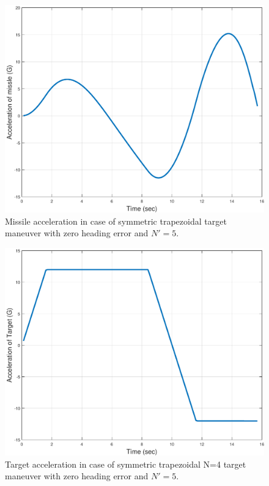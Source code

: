 \begin{figure}[htb]
	\centering
	\includegraphics[scale = 0.35]{fig/MissileAccelerationTrapSymm.pdf}
	\caption{Missile acceleration in case of symmetric trapezoidal target maneuver with zero heading error and $N'=5$.}
	\label{missile acceleration trapSymm}
\end{figure}

\begin{figure}[H]
	\centering
	\includegraphics[scale = 0.35]{fig/TargetAccelerationTrapSym.pdf}
	\caption{Target acceleration in case of symmetric trapezoidal N=4 target maneuver with zero heading error and $N'=5$.}
	\label{Target acceleration trapSymm}
\end{figure}

